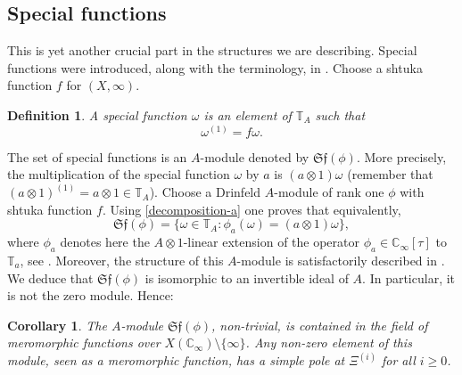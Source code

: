 \documentclass[11pt]{amsart}
\numberwithin{equation}{section}
\newcommand{\CC}{\mathbb{C}}
\newcommand{\TT}{\mathbb{T}}
\newtheorem{Corollary}[Theorem]{Corollary}
\newtheorem{Definition}[Theorem]{Definition}
\begin{document}
\subsection{Special functions}\label{Special-functions} This is yet another crucial part in the structures we are describing. Special functions were introduced,
along with the terminology, in \cite[\S 3.2]{ANG&NGO&TAV1}. Choose a shtuka function $f$ for $(X,\infty)$.
\begin{Definition}\label{definition-Special-functions}{\em A {\em special function} $\omega$ is an element of $\TT_A$ such that 
\begin{equation}\label{tau-difference-equation}
\omega^{(1)}=f\omega.\end{equation}}\end{Definition} 
The set of special functions is an $A$-module denoted by $\mathfrak{Sf}(\phi)$. More precisely, the multiplication of the special function $\omega$ by $a$ is $(a\otimes1)\omega$ (remember that $(a\otimes1)^{(1)}=a\otimes1\in\TT_A$). 
Choose a Drinfeld $A$-module of rank one $\phi$ with shtuka function $f$. 
Using \eqref{decomposition-a}
one proves that equivalently, 
$$\mathfrak{Sf}(\phi)=\{\omega\in\TT_A:\phi_a(\omega)=(a\otimes1)\omega\},$$
where $\phi_a$ denotes here the $A\otimes1$-linear extension of the operator $\phi_a\in\CC_\infty[\tau]$ to $\TT_a$, see
\cite[Lemma 3.6]{ANG&NGO&TAV1}. Moreover, the structure of this $A$-module is satisfactorily described in \cite[Theorem 3.11]{GAZ&MAU}. We deduce that $\mathfrak{Sf}(\phi)$ is isomorphic to an invertible ideal of $A$. In particular,
it is not the zero module. Hence:

\begin{Corollary}\label{meromorphic-omega}
The $A$-module $\mathfrak{Sf}(\phi)$, non-trivial, is contained in the field of meromorphic functions over $X(\CC_\infty)\setminus\{\infty\}$. Any non-zero element of this module, seen as a meromorphic function,
has a simple pole at $\Xi^{(i)}$ for all $i\geq 0$.
\end{Corollary}
\end{document}
